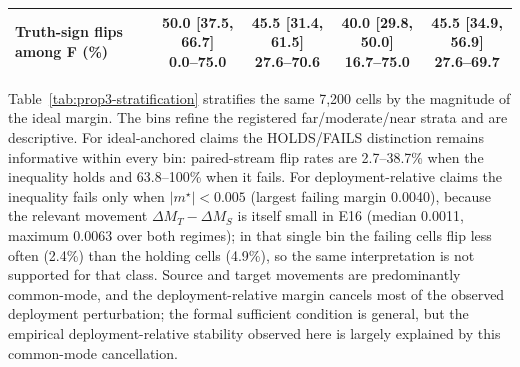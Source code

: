 \documentclass[11pt,a4paper]{article}
\begin{document}
\begin{table}[H]
{\begin{tabular}{lcccc}
Truth-sign flips among F (\%) & \shortstack{50.0 [37.5, 66.7]\\0.0--75.0} & \shortstack{45.5 [31.4, 61.5]\\27.6--70.6} & \shortstack{40.0 [29.8, 50.0]\\16.7--75.0} & \shortstack{45.5 [34.9, 56.9]\\27.6--69.7} \\
\bottomrule
\end{tabular}%
}
\end{table}

Table~\ref{tab:prop3-stratification} stratifies the same 7,200 cells by the
magnitude of the ideal margin. The bins refine the registered far/moderate/near
strata and are descriptive. For ideal-anchored claims the HOLDS/FAILS
distinction remains informative within every bin: paired-stream flip rates are
2.7--38.7\% when the inequality holds and 63.8--100\% when it fails. For
deployment-relative claims the inequality fails only when
$|m^\star|<0.005$ (largest failing margin 0.0040), because the relevant
movement $\Delta M_T-\Delta M_S$ is itself small in E16 (median 0.0011,
maximum 0.0063 over both regimes); in that single bin the failing cells flip
less often (2.4\%) than the holding cells (4.9\%), so the same interpretation
is not supported for that class. Source and target movements are predominantly
common-mode, and the deployment-relative margin cancels most of the observed
deployment perturbation; the formal sufficient condition is general, but the
empirical deployment-relative stability observed here is largely explained by
this common-mode cancellation.
\end{document}
